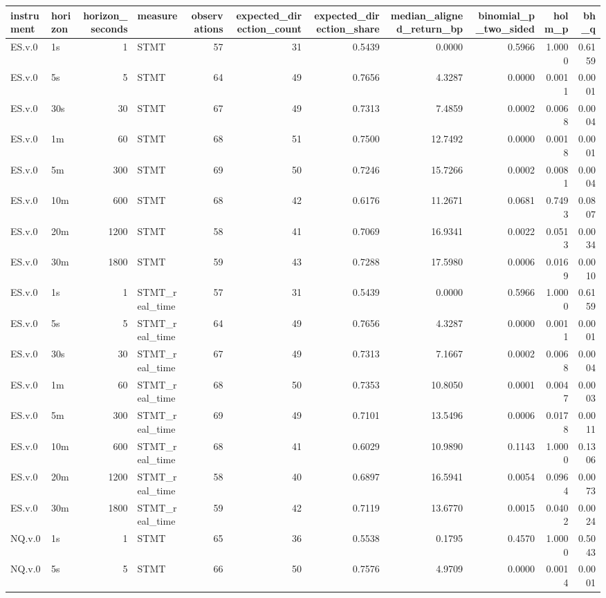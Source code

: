 \begin{tabular}{llrlrrrrrrr}
\toprule
instrument & horizon & horizon_seconds & measure & observations & expected_direction_count & expected_direction_share & median_aligned_return_bp & binomial_p_two_sided & holm_p & bh_q \\
\midrule
ES.v.0 & 1s & 1 & STMT & 57 & 31 & 0.5439 & 0.0000 & 0.5966 & 1.0000 & 0.6159 \\
ES.v.0 & 5s & 5 & STMT & 64 & 49 & 0.7656 & 4.3287 & 0.0000 & 0.0011 & 0.0001 \\
ES.v.0 & 30s & 30 & STMT & 67 & 49 & 0.7313 & 7.4859 & 0.0002 & 0.0068 & 0.0004 \\
ES.v.0 & 1m & 60 & STMT & 68 & 51 & 0.7500 & 12.7492 & 0.0000 & 0.0018 & 0.0001 \\
ES.v.0 & 5m & 300 & STMT & 69 & 50 & 0.7246 & 15.7266 & 0.0002 & 0.0081 & 0.0004 \\
ES.v.0 & 10m & 600 & STMT & 68 & 42 & 0.6176 & 11.2671 & 0.0681 & 0.7493 & 0.0807 \\
ES.v.0 & 20m & 1200 & STMT & 58 & 41 & 0.7069 & 16.9341 & 0.0022 & 0.0513 & 0.0034 \\
ES.v.0 & 30m & 1800 & STMT & 59 & 43 & 0.7288 & 17.5980 & 0.0006 & 0.0169 & 0.0010 \\
ES.v.0 & 1s & 1 & STMT_real_time & 57 & 31 & 0.5439 & 0.0000 & 0.5966 & 1.0000 & 0.6159 \\
ES.v.0 & 5s & 5 & STMT_real_time & 64 & 49 & 0.7656 & 4.3287 & 0.0000 & 0.0011 & 0.0001 \\
ES.v.0 & 30s & 30 & STMT_real_time & 67 & 49 & 0.7313 & 7.1667 & 0.0002 & 0.0068 & 0.0004 \\
ES.v.0 & 1m & 60 & STMT_real_time & 68 & 50 & 0.7353 & 10.8050 & 0.0001 & 0.0047 & 0.0003 \\
ES.v.0 & 5m & 300 & STMT_real_time & 69 & 49 & 0.7101 & 13.5496 & 0.0006 & 0.0178 & 0.0011 \\
ES.v.0 & 10m & 600 & STMT_real_time & 68 & 41 & 0.6029 & 10.9890 & 0.1143 & 1.0000 & 0.1306 \\
ES.v.0 & 20m & 1200 & STMT_real_time & 58 & 40 & 0.6897 & 16.5941 & 0.0054 & 0.0964 & 0.0073 \\
ES.v.0 & 30m & 1800 & STMT_real_time & 59 & 42 & 0.7119 & 13.6770 & 0.0015 & 0.0402 & 0.0024 \\
NQ.v.0 & 1s & 1 & STMT & 65 & 36 & 0.5538 & 0.1795 & 0.4570 & 1.0000 & 0.5043 \\
NQ.v.0 & 5s & 5 & STMT & 66 & 50 & 0.7576 & 4.9709 & 0.0000 & 0.0014 & 0.0001 \\

\end{tabular}
